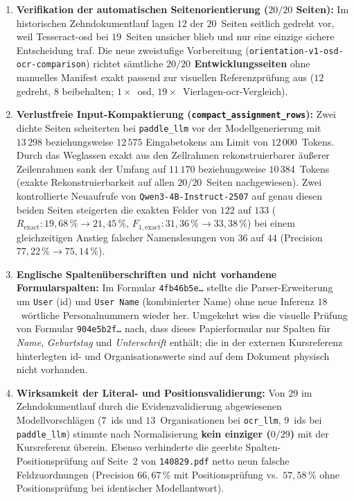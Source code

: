 \begin{enumerate}
  \item \textbf{Verifikation der automatischen Seitenorientierung ($20/20$ Seiten):} Im historischen Zehndokumentlauf lagen $12$ der $20$~Seiten seitlich gedreht vor, weil Tesseract-\ac{osd} bei $19$~Seiten unsicher blieb und nur eine einzige sichere Entscheidung traf. Die neue zweistufige Vorbereitung (\texttt{orientation-v1-osd-ocr-comparison}) richtet sämtliche \textbf{$20/20$ Entwicklungsseiten} ohne manuelles Manifest exakt passend zur visuellen Referenzprüfung aus ($12$ gedreht, $8$ beibehalten; $1\times$~\ac{osd}, $19\times$~Vierlagen-\ac{ocr}-Vergleich).
  \item \textbf{Verlustfreie Input-Kompaktierung (\texttt{compact\_assignment\_rows}):} Zwei dichte Seiten scheiterten bei \texttt{paddle\_llm} vor der Modellgenerierung mit $13\,298$ beziehungsweise $12\,575$ Eingabetokens am Limit von $12\,000$~Tokens. Durch das Weglassen exakt aus den Zellrahmen rekonstruierbarer äußerer Zeilenrahmen sank der Umfang auf $11\,170$ beziehungsweise $10\,384$~Tokens (exakte Rekonstruierbarkeit auf allen $20/20$~Seiten nachgewiesen). Zwei kontrollierte Neuaufrufe von \texttt{Qwen3-4B-Instruct-2507} auf genau diesen beiden Seiten steigerten die exakten Felder von $122$ auf $133$ ($R_{\mathrm{exact}}: 19{,}68\,\% \rightarrow 21{,}45\,\%$, $F_{1,\mathrm{exact}}: 31{,}36\,\% \rightarrow 33{,}38\,\%$) bei einem gleichzeitigen Anstieg falscher Namenslesungen von $36$ auf $44$ (Precision $77{,}22\,\% \rightarrow 75{,}14\,\%$).
  \item \textbf{Englische Spaltenüberschriften und nicht vorhandene Formularspalten:} Im Formular \texttt{4fb46b5e…} stellte die Parser-Erweiterung um \texttt{User} (\ac{id}) und \texttt{User Name} (kombinierter Name) ohne neue Inferenz $18$~wörtliche Personalnummern wieder her. Umgekehrt wies die visuelle Prüfung von Formular \texttt{904e5b2f…} nach, dass dieses Papierformular nur Spalten für \emph{Name}, \emph{Geburtstag} und \emph{Unterschrift} enthält; die in der externen Kursreferenz hinterlegten \ac{id}- und Organisationswerte sind auf dem Dokument physisch nicht vorhanden.
  \item \textbf{Wirksamkeit der Literal- und Positionsvalidierung:} Von $29$ im Zehndokumentlauf durch die Evidenzvalidierung abgewiesenen Modellvorschlägen ($7$~\acp{id} und $13$~Organisationen bei \texttt{ocr\_llm}, $9$~\acp{id} bei \texttt{paddle\_llm}) stimmte nach Normalisierung \textbf{kein einziger ($0/29$)} mit der Kursreferenz überein. Ebenso verhinderte die geerbte Spalten-Positionsprüfung auf Seite~2 von \texttt{140829.pdf} netto neun falsche Feldzuordnungen (Precision $66{,}67\,\%$ mit Positionsprüfung vs.\ $57{,}58\,\%$ ohne Positionsprüfung bei identischer Modellantwort).
\end{enumerate}

